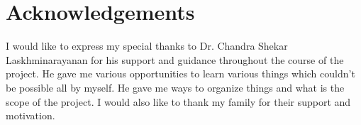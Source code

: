 \chapter*{\centering Acknowledgements}
\quad I would like to express my special thanks to Dr. Chandra Shekar Laskhminarayanan for his support and guidance throughout the course of the project. He gave me various opportunities to learn various things which couldn't be possible all by myself. He gave me ways to organize things and what is the scope of the project. I would also like to thank my family for their support and motivation.
